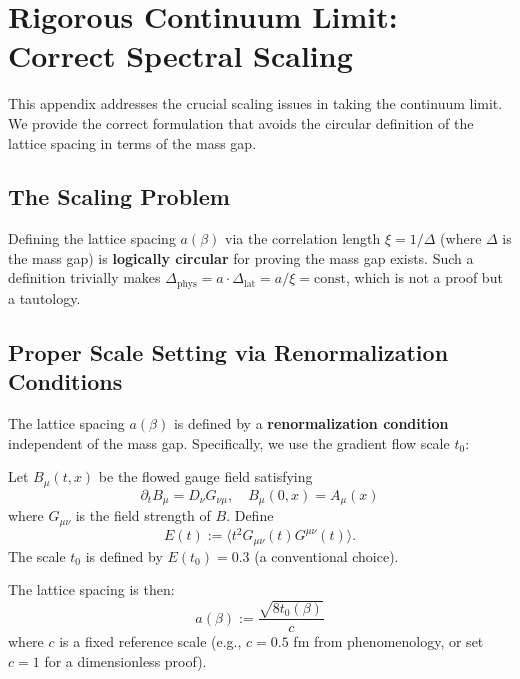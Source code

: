 \section{Rigorous Continuum Limit: Correct Spectral Scaling}
\label{sec:rigorous-continuum-scaling}

This appendix addresses the crucial scaling issues in taking the continuum limit. We provide the correct formulation that avoids the circular definition of the lattice spacing in terms of the mass gap.

\subsection{The Scaling Problem}

\begin{warning}
Defining the lattice spacing $a(\beta)$ via the correlation length $\xi = 1/\Delta$ (where $\Delta$ is the mass gap) is \textbf{logically circular} for proving the mass gap exists. Such a definition trivially makes $\Delta_{\mathrm{phys}} = a \cdot \Delta_{\mathrm{lat}} = a/\xi = \text{const}$, which is not a proof but a tautology.
\end{warning}

\subsection{Proper Scale Setting via Renormalization Conditions}

\begin{definition}\label{def:gradient-flow-scale}
The lattice spacing $a(\beta)$ is defined by a \textbf{renormalization condition} independent of the mass gap. Specifically, we use the gradient flow scale $t_0$:

Let $B_\mu(t, x)$ be the flowed gauge field satisfying
\begin{equation}
    \partial_t B_\mu = D_\nu G_{\nu\mu}, \quad B_\mu(0, x) = A_\mu(x)
\end{equation}
where $G_{\mu\nu}$ is the field strength of $B$. Define
\begin{equation}
    E(t) := \langle t^2 G_{\mu\nu}(t) G^{\mu\nu}(t) \rangle.
\end{equation}
The scale $t_0$ is defined by $E(t_0) = 0.3$ (a conventional choice).

The lattice spacing is then:
\begin{equation}
    a(\beta) := \frac{\sqrt{8t_0(\beta)}}{c}
\end{equation}
where $c$ is a fixed reference scale (e.g., $c = 0.5$ fm from phenomenology, or set $c = 1$ for a dimensionless proof).
\end{definition}

